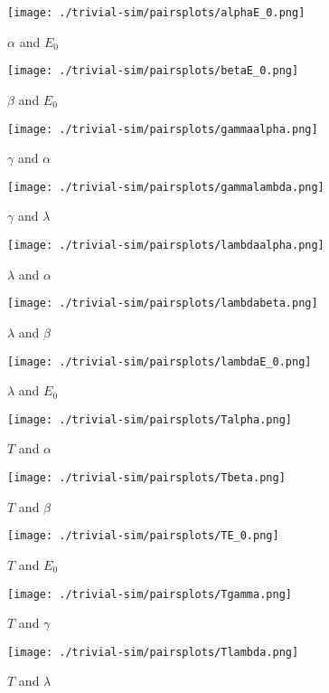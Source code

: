 \documentclass[iop,onecolumn]{emulateapj}
\begin{document}
\begin{figure}
 \centering
\texttt{[image: ./trivial-sim/pairsplots/alphaE\_0.png]}
\caption{$\alpha$ and $E_0$}
\end{figure}

\begin{figure}
 \centering
\texttt{[image: ./trivial-sim/pairsplots/betaE\_0.png]}
\caption{$\beta$ and $E_0$}
\end{figure}

\begin{figure}
 \centering
\texttt{[image: ./trivial-sim/pairsplots/gammaalpha.png]}
\caption{$\gamma$ and $\alpha$}
\end{figure}

\begin{figure}
 \centering
\texttt{[image: ./trivial-sim/pairsplots/gammalambda.png]}
\caption{$\gamma$ and $\lambda$}
\end{figure}

\begin{figure}
 \centering
\texttt{[image: ./trivial-sim/pairsplots/lambdaalpha.png]}
\caption{$\lambda$ and $\alpha$}
\end{figure}
\begin{figure}
 \centering
\texttt{[image: ./trivial-sim/pairsplots/lambdabeta.png]}
\caption{$\lambda$ and $\beta$}
\end{figure}

\clearpage

\begin{figure}
 \centering
\texttt{[image: ./trivial-sim/pairsplots/lambdaE\_0.png]}
\caption{$\lambda$ and $E_0$}
\end{figure}
\begin{figure}
 \centering
\texttt{[image: ./trivial-sim/pairsplots/Talpha.png]}
\caption{$T$ and $\alpha$}
\end{figure}
\begin{figure}
 \centering
\texttt{[image: ./trivial-sim/pairsplots/Tbeta.png]}
\caption{$T$ and $\beta$}
\end{figure}
\newpage
\begin{figure}
 \centering
\texttt{[image: ./trivial-sim/pairsplots/TE\_0.png]}
\caption{$T$ and $E_0$}
\end{figure}

\begin{figure}
 \centering
\texttt{[image: ./trivial-sim/pairsplots/Tgamma.png]}
\caption{$T$ and $\gamma$}
\end{figure}
\begin{figure}
 \centering
\texttt{[image: ./trivial-sim/pairsplots/Tlambda.png]}
\caption{$T$ and $\lambda$}
\end{figure}
\end{document}
